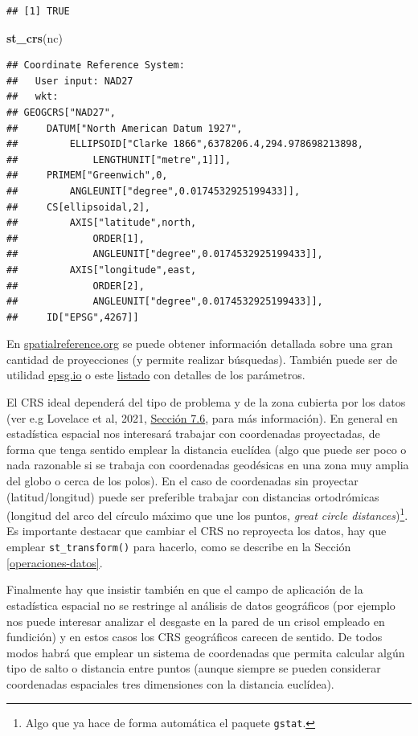 \documentclass[
]{book}
\newenvironment{Shaded}{\begin{snugshade}}{\end{snugshade}}
\newcommand{\FunctionTok}[1]{\textcolor[rgb]{0.13,0.29,0.53}{\textbf{#1}}}
\newcommand{\NormalTok}[1]{#1}
\theoremstyle{break}
\theoremstyle{definition}
\theoremstyle{definition}
\theoremstyle{definition}
\theoremstyle{definition}
\theoremstyle{remark}
\begin{document}
\begin{verbatim}
## [1] TRUE
\end{verbatim}

\begin{Shaded}
\begin{Highlighting}[]
\FunctionTok{st\_crs}\NormalTok{(nc)}
\end{Highlighting}
\end{Shaded}

\begin{verbatim}
## Coordinate Reference System:
##   User input: NAD27 
##   wkt:
## GEOGCRS["NAD27",
##     DATUM["North American Datum 1927",
##         ELLIPSOID["Clarke 1866",6378206.4,294.978698213898,
##             LENGTHUNIT["metre",1]]],
##     PRIMEM["Greenwich",0,
##         ANGLEUNIT["degree",0.0174532925199433]],
##     CS[ellipsoidal,2],
##         AXIS["latitude",north,
##             ORDER[1],
##             ANGLEUNIT["degree",0.0174532925199433]],
##         AXIS["longitude",east,
##             ORDER[2],
##             ANGLEUNIT["degree",0.0174532925199433]],
##     ID["EPSG",4267]]
\end{verbatim}

En \href{https://spatialreference.org}{spatialreference.org} se puede obtener información detallada sobre una gran cantidad de proyecciones (y permite realizar búsquedas).
También puede ser de utilidad \href{https://epsg.io}{epsg.io} o este \href{https://proj.org/operations/projections}{listado} con detalles de los parámetros.

El CRS ideal dependerá del tipo de problema y de la zona cubierta por los datos (ver e.g Lovelace et al, 2021, \href{https://geocompr.robinlovelace.net/reproj-geo-data.html\#which-crs}{Sección 7.6}, para más información).
En general en estadística espacial nos interesará trabajar con coordenadas proyectadas, de forma que tenga sentido emplear la distancia euclídea (algo que puede ser poco o nada razonable si se trabaja con coordenadas geodésicas en una zona muy amplia del globo o cerca de los polos).
En el caso de coordenadas sin proyectar (latitud/longitud) puede ser preferible trabajar con distancias ortodrómicas (longitud del arco del círculo máximo que une los puntos, \emph{great circle distances})\footnote{Algo que ya hace de forma automática el paquete \texttt{gstat}.}.
Es importante destacar que cambiar el CRS no reproyecta los datos, hay que emplear \texttt{st\_transform()} para hacerlo, como se describe en la Sección \ref{operaciones-datos}.

Finalmente hay que insistir también en que el campo de aplicación de la estadística espacial no se restringe al análisis de datos geográficos (por ejemplo nos puede interesar analizar el desgaste en la pared de un crisol empleado en fundición) y en estos casos los CRS geográficos carecen de sentido.
De todos modos habrá que emplear un sistema de coordenadas que permita calcular algún tipo de salto o distancia entre puntos (aunque siempre se pueden considerar coordenadas espaciales tres dimensiones con la distancia euclídea).
\end{document}
